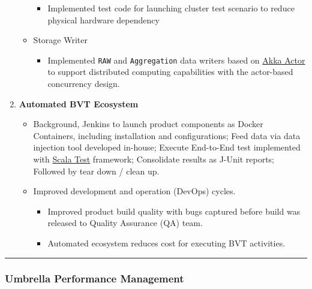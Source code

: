 \documentclass[
]{article}
\providecommand{\tightlist}{%
  \setlength{\itemsep}{0pt}\setlength{\parskip}{0pt}}
\begin{document}
\begin{enumerate}
\begin{itemize}
    \begin{itemize}
    \tightlist
    \item
      Implemented test code for launching cluster test scenario to
      reduce physical hardware dependency
    \end{itemize}
  \item
    Storage Writer

    \begin{itemize}
    \tightlist
    \item
      Implemented \texttt{RAW} and \texttt{Aggregation} data writers
      based on \href{http://akka.io/}{Akka Actor} to support distributed
      computing capabilities with the actor-based concurrency design.
    \end{itemize}
  \end{itemize}
\item
  \textbf{Automated BVT Ecosystem}

  \begin{itemize}
  \tightlist
  \item
    Background, Jenkins to launch product components as Docker
    Containers, including installation and configurations; Feed data via
    data injection tool developed in-house; Execute End-to-End test
    implemented with \href{http://www.scalatest.org/}{Scala Test}
    framework; Consolidate results as J-Unit reports; Followed by tear
    down / clean up.
  \item
    Improved development and operation (DevOps) cycles.

    \begin{itemize}
    \tightlist
    \item
      Improved product build quality with bugs captured before build was
      released to Quality Assurance (QA) team.
    \item
      Automated ecosystem reduces cost for executing BVT activities.
    \end{itemize}
  \end{itemize}
\end{enumerate}

\begin{center}\rule{0.5\linewidth}{0.5pt}\end{center}

\hypertarget{umbrella-performance-management}{%
\subsubsection{Umbrella Performance
Management}\label{umbrella-performance-management}}
\end{document}
